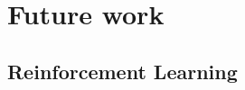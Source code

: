 \documentclass{beamer}
\begin{document}
	\begin{frame}
	\end{frame}
	
	\section{Future work}
	\subsection{Reinforcement Learning}
\end{document}

